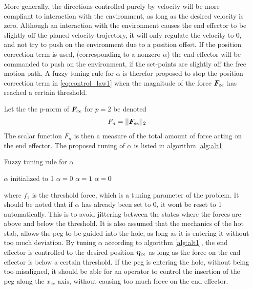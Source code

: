 More generally, the directions controlled purely by velocity will be more compliant to interaction with the environment, as long as the desired velocity is zero. Although an interaction with the environment causes the end effector to be slightly off the planed velocity trajectory, it will only regulate the velocity to 0, and not try to push on the environment due to a position offset. If the position correction term is used, (corresponding to a nonzero $\alpha$)
the end effector will be commanded to push on the environment, if the set-points are slightly off the free motion path. A fuzzy tuning rule for $\alpha$ is therefor proposed to stop the position correction term in \eqref{eq:control_law1} when the magnitude of the force $\boldsymbol F_{ee}$ has reached a certain threshold. 



Let the the p-norm of $\boldsymbol F_{ee}$ for $p=2$ be denoted $$F_n=||\boldsymbol F_{ee}||_{2}$$ The scalar function $F_{n}$ is then a measure of the total amount of force acting on the end effector. The proposed tuning of $\alpha$ is listed in algorithm \ref{alg:alt1} 
	\begin{Algorithm}{12cm}
	\caption{Fuzzy tuning rule for $\alpha$ \label{alg:alt1}}
\begin{algorithmic}
	\REQUIRE $\alpha$ initialized to 1
    \STATE    $\alpha=0$
        \STATE $\alpha=1$
    \ELSE
        \STATE $\alpha = 0$
    \ENDIF
\end{algorithmic}
\end{Algorithm}

where $f_{1}$ is the threshold force, which is a tuning parameter of the problem. It should be noted that if $\alpha$ has already been set to 0, it wont be reset to 1 automatically. This is to avoid jittering between the states where the forces are above and below the threshold. It is also assumed that the mechanics of the hot stab, allows the peg to be guided into the hole, as long as it is entering it without too much deviation.  By tuning $\alpha$ according to algorithm \ref{alg:alt1}, the end effector is controlled to the desired position $\boldsymbol \eta_{ee}$ as long as the force on the end effector is below a certain threshold. If the peg is entering the hole, without being too misaligned, it should be able for an operator to control the insertion of the peg along the $x_{ee}$ axis, without causing too much force on the end effector. 























